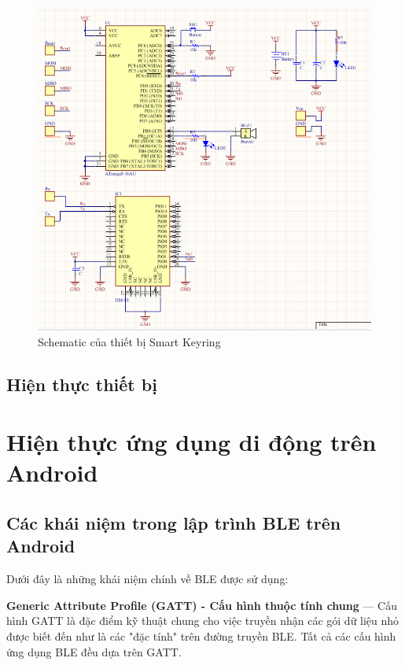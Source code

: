 	\begin{figure}[!ht]
		\centering    
		\includegraphics[width=1.0\textwidth]{schematic}
		\caption[Schematic của thiết bị Smart Keyring]{Schematic của thiết bị Smart Keyring}
		\label{fig: schematic}
	\end{figure}
	
\subsection{Hiện thực thiết bị}



\section{Hiện thực ứng dụng di động trên Android}

\subsection{Các khái niệm trong lập trình BLE trên Android}
Dưới đây là những khái niệm chính về BLE được sử dụng:

\textbf{Generic Attribute Profile (GATT) -  Cấu hình thuộc tính chung }— Cấu hình GATT là đặc điểm kỹ thuật chung cho việc truyền nhận các gói dữ liệu nhỏ được biết đến như là các "đặc tính" trên đường truyền BLE. Tất cả các cấu hình ứng dụng BLE đều dựa trên GATT.


